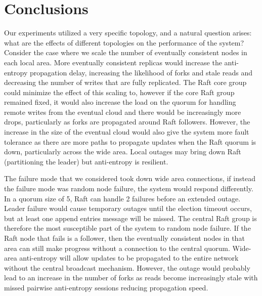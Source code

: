 \documentclass[10pt,conference,letterpaper]{IEEEtran}
\begin{document}
\section{Conclusions}

Our experiments utilized a very specific topology, and a natural question arises: what are the effects of different topologies on the performance of the system? Consider the case where we scale the number of eventually consistent nodes in each local area. More eventually consistent replicas would increase the anti-entropy propagation delay, increasing the likelihood of forks and stale reads and decreasing the number of writes that are fully replicated. The Raft core group could minimize the effect of this scaling to, however if the core Raft group remained fixed, it would also increase the load on the quorum for handling remote writes from the eventual cloud and there would be increasingly more drops, particularly as forks are propagated around Raft followers. However, the increase in the size of the eventual cloud would also give the system more fault tolerance as there are more paths to propagate updates when the Raft quorum is down, particularly across the wide area. Local outages may bring down Raft (partitioning the leader) but anti-entropy is resilient.

The failure mode that we considered took down wide area connections, if instead the failure mode was random node failure, the system would respond differently. In a quorum size of 5, Raft can handle 2 failures before an extended outage. Leader failure would cause temporary outages until the election timeout occurs, but at least one append entries message will be missed. The central Raft group is therefore the most susceptible part of the system to random node failure. If the Raft node that fails is a follower, then the eventually consistent nodes in that area can still make progress without a connection to the central quorum. Wide-area anti-entropy will allow updates to be propagated to the entire network without the central broadcast mechanism. However, the outage would probably lead to an increase in the number of forks as reads become increasingly stale with missed pairwise anti-entropy sessions reducing propagation speed.
\end{document}
